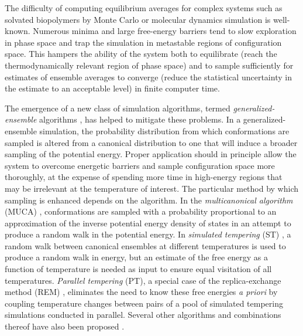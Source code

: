 The difficulty of computing equilibrium averages for complex systems such as solvated biopolymers by Monte Carlo or molecular dynamics simulation is well-known.  Numerous minima and large free-energy barriers tend to slow exploration in phase space and trap the simulation in metastable regions of configuration space.  This hampers the ability of the system both to equilibrate (reach the thermodynamically relevant region of phase space) and to sample sufficiently for estimates of ensemble averages to converge (reduce the statistical uncertainty in the estimate to an acceptable level) in finite computer time.

The emergence of a new class of simulation algorithms, termed \emph{generalized-ensemble} algorithms \cite{okamoto:2004a}, has helped to mitigate these problems.  In a generalized-ensemble simulation, the probability distribution from which conformations are sampled is altered from a canonical distribution to one that will induce a broader sampling of the potential energy.  Proper application should in principle allow the system to overcome energetic barriers and sample configuration space more thoroughly, at the expense of spending more time in high-energy regions that may be irrelevant at the temperature of interest.  The particular method by which sampling is enhanced depends on the algorithm. In the \emph{multicanonical algorithm} (MUCA) \cite{berg:1991a,berg:1992a,hansmann:1993a,nakajima:1997a,yasar:2000a}, conformations are sampled with a probability proportional to an approximation of the inverse potential energy density of states in an attempt to produce a random walk in the potential energy.  In \emph{simulated tempering} (ST) \cite{marinari:1992a,lyubartsev:1992a,mitsutake:2000a}, a random walk between canonical ensembles at different temperatures is used to produce a random walk in energy, but an estimate of the free energy as a function of temperature is needed as input to ensure equal visitation of all temperatures.  \emph{Parallel tempering} (PT), a special case of the replica-exchange method (REM) \cite{hansmann:1997a,sugita:1999a}, eliminates the need to know these free energies \emph{a priori} by coupling temperature changes between pairs of a pool of simulated tempering simulations conducted in parallel.  Several other algorithms and combinations thereof have also been proposed \cite{mitsutake:2000a,mitsutake:2003a,mitsutake:2004a,sugita:2000b}.

